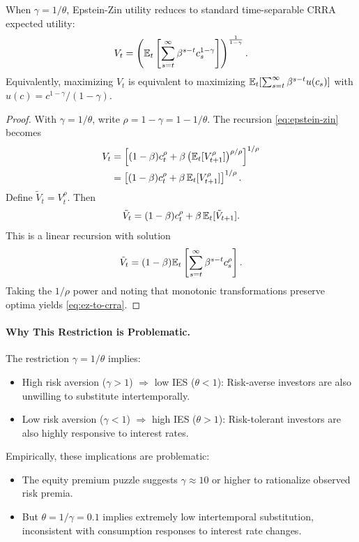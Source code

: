 \begin{proposition}
\label{prop:time-separable}
When $\gamma = 1/\theta$, Epstein-Zin utility reduces to standard time-separable CRRA expected utility:
\begin{equation}
V_t = \left( \mathbb{E}_t \left[ \sum_{s=t}^{\infty} \beta^{s-t} c_s^{1-\gamma} \right] \right)^{\frac{1}{1-\gamma}}.
\label{eq:ez-to-crra}
\end{equation}
Equivalently, maximizing $V_t$ is equivalent to maximizing $\mathbb{E}_t[\sum_{s=t}^{\infty} \beta^{s-t} u(c_s)]$ with $u(c) = c^{1-\gamma}/(1-\gamma)$.
\end{proposition}

\begin{proof}
With $\gamma = 1/\theta$, write $\rho = 1 - \gamma = 1 - 1/\theta$. The recursion \eqref{eq:epstein-zin} becomes
\begin{align}
V_t &= \left[ (1-\beta) c_t^{\rho} + \beta \left( \mathbb{E}_t[V_{t+1}^{\rho}] \right)^{\rho/\rho} \right]^{1/\rho} \notag \\
&= \left[ (1-\beta) c_t^{\rho} + \beta \, \mathbb{E}_t[V_{t+1}^{\rho}] \right]^{1/\rho}.
\label{eq:collapsed-recursion}
\end{align}
Define $\tilde{V}_t = V_t^{\rho}$. Then
\[
\tilde{V}_t = (1-\beta) c_t^{\rho} + \beta \, \mathbb{E}_t[\tilde{V}_{t+1}].
\]
This is a linear recursion with solution
\[
\tilde{V}_t = (1-\beta) \mathbb{E}_t \left[ \sum_{s=t}^{\infty} \beta^{s-t} c_s^{\rho} \right].
\]
Taking the $1/\rho$ power and noting that monotonic transformations preserve optima yields \eqref{eq:ez-to-crra}.
\end{proof}

\paragraph{Why This Restriction is Problematic.}

The restriction $\gamma = 1/\theta$ implies:
\begin{itemize}[nosep]
    \item High risk aversion ($\gamma > 1$) $\Rightarrow$ low IES ($\theta < 1$): Risk-averse investors are also unwilling to substitute intertemporally.
    \item Low risk aversion ($\gamma < 1$) $\Rightarrow$ high IES ($\theta > 1$): Risk-tolerant investors are also highly responsive to interest rates.
\end{itemize}

Empirically, these implications are problematic:
\begin{itemize}[nosep]
    \item The equity premium puzzle suggests $\gamma \approx 10$ or higher to rationalize observed risk premia.
    \item But $\theta = 1/\gamma = 0.1$ implies extremely low intertemporal substitution, inconsistent with consumption responses to interest rate changes.
\end{itemize}

